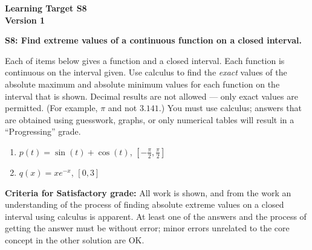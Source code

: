\documentclass[10pt]{article}
\begin{document}
	\vspace*{0in}

		\begin{center}
			\textbf{Learning Target S8 \\
			Version 1} 
		\end{center}


\begin{framed}
	\textbf{S8: Find extreme values of a continuous function on a closed interval.}
\end{framed}

Each of items below gives a function and a closed interval. Each function is continuous on the interval given. Use calculus to find the \emph{exact} values of the absolute maximum and absolute minimum values for each function on the interval that is shown. Decimal results are not allowed --- only exact values are permitted. (For example, $\pi$ and not $3.141$.) You must use calculus; answers that are obtained using guesswork, graphs, or only numerical tables will result in a ``Progressing'' grade. 

\begin{enumerate}
    \item $p(t) = \sin(t) + \cos(t)$, $[-\frac{\pi}{2},\frac{\pi}{2}]$
    \item $q(x) = xe^{-x}$, $[0,3]$
\end{enumerate}




\vfill



\begin{small}
    \begin{framed}
        	\textbf{Criteria for Satisfactory grade:} All work is shown, and from the work an understanding of the process of finding absolute extreme values on a closed interval using calculus is apparent. At least one of the answers and the process of getting the answer must be without error; minor errors unrelated to the core concept in the other solution are OK. 
    \end{framed}

\end{small}
\end{document}
